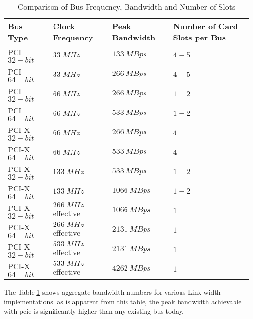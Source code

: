 \begin{table}
	\centering
	\renewcommand\arraystretch{2}
	\caption{Comparison of Bus Frequency, Bandwidth and Number of Slots}\label{table:comparison-of-bus-frequency-bandwidth-slots}
	\begin{tabular}{l | l | l | p{3cm}}
		Bus Type & Clock Frequency & Peak Bandwidth & Number of Card Slots per Bus
		\\ \hline \hline
		PCI $ 32-bit $ & $ 33 \ MHz $ & $ 133 \ MBps $ & $ 4-5 $
		\\ \hline
		PCI $ 64-bit $ & $ 33 \ MHz $ & $ 266 \ MBps $ & $ 4-5 $
		\\ \hline
		PCI $ 32-bit $ & $ 66 \ MHz $ & $ 266 \ MBps $ & $ 1-2 $
		\\ \hline
		PCI $ 64-bit $ & $ 66 \ MHz $ & $ 533 \ MBps $ & $ 1-2 $
		\\ \hline
		PCI-X $ 32-bit $ & $ 66 \ MHz $ & $ 266 \ MBps $ & $ 4 $
		\\ \hline
		PCI-X $ 64-bit $ & $ 66 \ MHz $ & $ 533 \ MBps $ & $ 4 $
		\\ \hline
		PCI-X $ 32-bit $ & $ 133 \ MHz $ & $ 533 \ MBps $ & $ 1-2 $
		\\ \hline
		PCI-X $ 64-bit $ & $ 133 \ MHz $ & $ 1066 \ MBps $ & $ 1-2 $
		\\ \hline
		PCI-X $ 32-bit $ & $ 266 \ MHz $ effective & $ 1066 \ MBps $ & $ 1 $
		\\ \hline
		PCI-X $ 64-bit $ & $ 266 \ MHz $ effective & $ 2131 \ MBps $ & $ 1 $
		\\ \hline
		PCI-X $ 32-bit $ & $ 533 \ MHz $ effective & $ 2131 \ MBps $ & $ 1 $
		\\ \hline
		PCI-X $ 64-bit $ & $ 533 \ MHz $ effective & $ 4262 \ MBps $ & $ 1 $
		\\ \hline
	\end{tabular}
\end{table}

The Table \ref{table:comparison-of-bus-frequency-bandwidth-slots} shows aggregate bandwidth numbers for various Link width implementations, as is apparent from this table, the peak bandwidth achievable with \gls{pcie} is significantly higher than any existing bus today.


